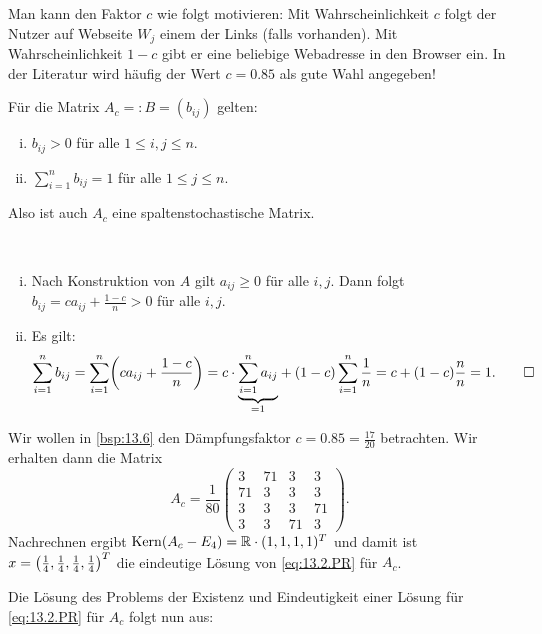 Man kann den Faktor $c$ wie folgt motivieren:
Mit Wahrscheinlichkeit $c$ folgt der Nutzer auf Webseite $W_j$ einem der Links (falls vorhanden).
Mit Wahrscheinlichkeit $1-c$ gibt er eine beliebige Webadresse in den Browser ein.
In der Literatur wird häufig der Wert $c = 0.85$ als gute Wahl angegeben!

\begin{lemma}
	\label{lemma:13.8}
	Für die Matrix $A_c =: B = (b_{ij})$ gelten:
	\begin{enumerate}[(i)]
		\item $b_{ij} > 0$ für alle $1 \leq i,j \leq n$.
		\item $\sum_{i=1}^{n} b_{ij} = 1$ für alle $1 \leq j \leq n$.
	\end{enumerate}
	Also ist auch $A_c$ eine spaltenstochastische Matrix.
\end{lemma}

\begin{beweis}
	\mbox{} \\[-.9cm]
	\begin{enumerate}[(i)]
		\item Nach Konstruktion von $A$ gilt $a_{ij} \geq 0$ für alle $i,j$.
		Dann folgt $b_{ij} = ca_{ij} + \frac{1-c}{n} > 0$ für alle $i,j$.
		\item Es gilt: 
		\[
			\sum_{i=1}^{n} b_{ij} = \sum_{i=1}^{n} \enb{ca_{ij} + \frac{1-c}{n}} = c \cdot \Underbrace{\sum_{i=1}^{n} a_{ij}}{=1} + (1-c) \sum_{i=1}^{n} \frac{1}{n} = c+(1-c) \frac{n}{n} = 1. \qedhere
		\]
	\end{enumerate}
	\qedhere
\end{beweis}

\begin{beispiel}
	\label{bsp:13.9}
	Wir wollen in \autoref{bsp:13.6} den Dämpfungsfaktor $c = 0.85 = \frac{17}{20}$ betrachten.
	Wir erhalten dann die Matrix
	\[
		A_c = \frac{1}{80} \begin{pmatrix}
			3  & 71 & 3  & 3  \\
			71 & 3  & 3  & 3  \\
			3  & 3  & 3  & 71 \\
			3  & 3  & 71 & 3
		\end{pmatrix}. 
	\]
	Nachrechnen ergibt $\operatorname{Kern}(A_c - E_4) = \mathbb{R} \cdot (1,1,1,1)^T$ und damit ist $x = \left(\frac{1}{4},\frac{1}{4},\frac{1}{4},\frac{1}{4}\right)^T$ die eindeutige Lösung von \eqref{eq:13.2.PR} für $A_c$.
\end{beispiel}

Die Lösung des Problems der Existenz und Eindeutigkeit einer Lösung für \eqref{eq:13.2.PR} für $A_c$ folgt nun aus: